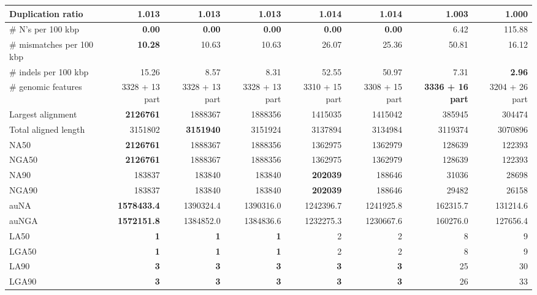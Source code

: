 \documentclass[12pt,a4paper]{article}
\begin{document}
\begin{table}[ht]
\begin{center}
\begin{tabular}{|l*{7}{|r}|}
Duplication ratio & 1.013 & 1.013 & 1.013 & 1.014 & 1.014 & 1.003 & {\bf 1.000} \\ \hline
\# N's per 100 kbp & {\bf 0.00} & {\bf 0.00} & {\bf 0.00} & {\bf 0.00} & {\bf 0.00} & 6.42 & 115.88 \\ \hline
\# mismatches per 100 kbp & {\bf 10.28} & 10.63 & 10.63 & 26.07 & 25.36 & 50.81 & 16.12 \\ \hline
\# indels per 100 kbp & 15.26 & 8.57 & 8.31 & 52.55 & 50.97 & 7.31 & {\bf 2.96} \\ \hline
\# genomic features & 3328 + 13 part & 3328 + 13 part & 3328 + 13 part & 3310 + 15 part & 3308 + 15 part & {\bf 3336 + 16 part} & 3204 + 26 part \\ \hline
Largest alignment & {\bf 2126761} & 1888367 & 1888356 & 1415035 & 1415042 & 385945 & 304474 \\ \hline
Total aligned length & 3151802 & {\bf 3151940} & 3151924 & 3137894 & 3134984 & 3119374 & 3070896 \\ \hline
NA50 & {\bf 2126761} & 1888367 & 1888356 & 1362975 & 1362979 & 128639 & 122393 \\ \hline
NGA50 & {\bf 2126761} & 1888367 & 1888356 & 1362975 & 1362979 & 128639 & 122393 \\ \hline
NA90 & 183837 & 183840 & 183840 & {\bf 202039} & 188646 & 31036 & 28698 \\ \hline
NGA90 & 183837 & 183840 & 183840 & {\bf 202039} & 188646 & 29482 & 26158 \\ \hline
auNA & {\bf 1578433.4} & 1390324.4 & 1390316.0 & 1242396.7 & 1241925.8 & 162315.7 & 131214.6 \\ \hline
auNGA & {\bf 1572151.8} & 1384852.0 & 1384836.6 & 1232275.3 & 1230667.6 & 160276.0 & 127656.4 \\ \hline
LA50 & {\bf 1} & {\bf 1} & {\bf 1} & 2 & 2 & 8 & 9 \\ \hline
LGA50 & {\bf 1} & {\bf 1} & {\bf 1} & 2 & 2 & 8 & 9 \\ \hline
LA90 & {\bf 3} & {\bf 3} & {\bf 3} & {\bf 3} & {\bf 3} & 25 & 30 \\ \hline
LGA90 & {\bf 3} & {\bf 3} & {\bf 3} & {\bf 3} & {\bf 3} & 26 & 33 \\ \hline
\end{tabular}
\end{center}
\end{table}
\end{document}

